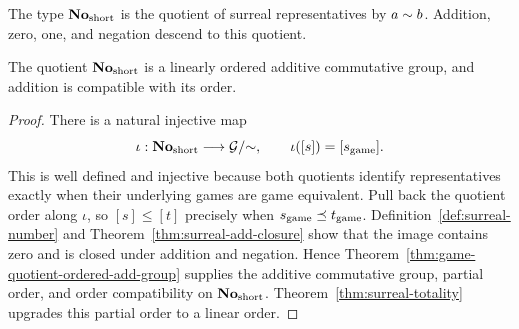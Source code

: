 \begin{definition}
  \label{def:surreal-number}
  \leanok
  The type \(\mathbf{No}_{\mathrm{short}}\) is the quotient of surreal representatives by \(a\sim b\).
  Addition, zero, one, and negation descend to this quotient.
\end{definition}

\begin{theorem}
  \label{thm:ordered-add-group}
  \leanok
  The quotient \(\mathbf{No}_{\mathrm{short}}\) is a linearly ordered additive commutative group, and addition is
  compatible with its order.
\end{theorem}
\begin{proof}
  \leanok
  There is a natural injective map
  \[
    \iota:\mathbf{No}_{\mathrm{short}}\longrightarrow\mathcal{G}/{\sim},
    \qquad \iota([s])=[s_{\mathrm{game}}].
  \]
  This is well defined and injective because both quotients identify representatives exactly
  when their underlying games are game equivalent.  Pull back the quotient order along
  \(\iota\), so \([s]\leq[t]\) precisely when
  \(s_{\mathrm{game}}\preceq t_{\mathrm{game}}\).  Definition~\ref{def:surreal-number} and
  Theorem~\ref{thm:surreal-add-closure} show that the image contains zero and is closed under
  addition and negation.  Hence Theorem~\ref{thm:game-quotient-ordered-add-group} supplies the
  additive commutative group, partial order, and order compatibility on \(\mathbf{No}_{\mathrm{short}}\).
  Theorem~\ref{thm:surreal-totality} upgrades this partial order to a linear order.
\end{proof}
